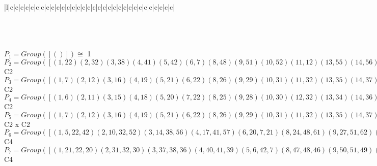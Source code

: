 \documentclass[varwidth=\maxdimen,border=10]{standalone}
\begin{document}
\begin{tabular}
\begin{array}{|l|c|c|c|c|c|c|c|c|c|c|c|c|c|c|c|c|c|c|c|c|c|c|c|c|c|c|c|c|c|c|c|c|}
\end{array}\)\\
\ \\
\ \\
$P_{1} = Group( [ () ] )\cong$ 1\ \\
$P_{2} = Group( [ ( 1,22)( 2,32)( 3,38)( 4,41)( 5,42)( 6, 7)( 8,48)( 9,51)(10,52)(11,12)(13,55)(14,56)(15,16)(17,57)(18,19)(20,21)(23,60)(24,61)(25,26)(27,62)(28,29)(30,31)(33,63)(34,35)(36,37)(39,40)(43,64)(44,45)(46,47)(49,50)(53,54)(58,59) ] )\cong$ C2\ \\
$P_{3} = Group( [ ( 1, 7)( 2,12)( 3,16)( 4,19)( 5,21)( 6,22)( 8,26)( 9,29)(10,31)(11,32)(13,35)(14,37)(15,38)(17,40)(18,41)(20,42)(23,45)(24,47)(25,48)(27,50)(28,51)(30,52)(33,54)(34,55)(36,56)(39,57)(43,59)(44,60)(46,61)(49,62)(53,63)(58,64) ] )\cong$ C2\ \\
$P_{4} = Group( [ ( 1, 6)( 2,11)( 3,15)( 4,18)( 5,20)( 7,22)( 8,25)( 9,28)(10,30)(12,32)(13,34)(14,36)(16,38)(17,39)(19,41)(21,42)(23,44)(24,46)(26,48)(27,49)(29,51)(31,52)(33,53)(35,55)(37,56)(40,57)(43,58)(45,60)(47,61)(50,62)(54,63)(59,64) ] )\cong$ C2\ \\
$P_{5} = Group( [ ( 1, 7)( 2,12)( 3,16)( 4,19)( 5,21)( 6,22)( 8,26)( 9,29)(10,31)(11,32)(13,35)(14,37)(15,38)(17,40)(18,41)(20,42)(23,45)(24,47)(25,48)(27,50)(28,51)(30,52)(33,54)(34,55)(36,56)(39,57)(43,59)(44,60)(46,61)(49,62)(53,63)(58,64), ( 1,22)( 2,32)( 3,38)( 4,41)( 5,42)( 6, 7)( 8,48)( 9,51)(10,52)(11,12)(13,55)(14,56)(15,16)(17,57)(18,19)(20,21)(23,60)(24,61)(25,26)(27,62)(28,29)(30,31)(33,63)(34,35)(36,37)(39,40)(43,64)(44,45)(46,47)(49,50)(53,54)(58,59) ] )\cong$ C2 x C2\ \\
$P_{6} = Group( [ ( 1, 5,22,42)( 2,10,32,52)( 3,14,38,56)( 4,17,41,57)( 6,20, 7,21)( 8,24,48,61)( 9,27,51,62)(11,30,12,31)(13,33,55,63)(15,36,16,37)(18,39,19,40)(23,43,60,64)(25,46,26,47)(28,49,29,50)(34,53,35,54)(44,58,45,59), ( 1,22)( 2,32)( 3,38)( 4,41)( 5,42)( 6, 7)( 8,48)( 9,51)(10,52)(11,12)(13,55)(14,56)(15,16)(17,57)(18,19)(20,21)(23,60)(24,61)(25,26)(27,62)(28,29)(30,31)(33,63)(34,35)(36,37)(39,40)(43,64)(44,45)(46,47)(49,50)(53,54)(58,59) ] )\cong$ C4\ \\
$P_{7} = Group( [ ( 1,21,22,20)( 2,31,32,30)( 3,37,38,36)( 4,40,41,39)( 5, 6,42, 7)( 8,47,48,46)( 9,50,51,49)(10,11,52,12)(13,54,55,53)(14,15,56,16)(17,18,57,19)(23,59,60,58)(24,25,61,26)(27,28,62,29)(33,34,63,35)(43,44,64,45), ( 1,22)( 2,32)( 3,38)( 4,41)( 5,42)( 6, 7)( 8,48)( 9,51)(10,52)(11,12)(13,55)(14,56)(15,16)(17,57)(18,19)(20,21)(23,60)(24,61)(25,26)(27,62)(28,29)(30,31)(33,63)(34,35)(36,37)(39,40)(43,64)(44,45)(46,47)(49,50)(53,54)(58,59) ] )\cong$ C4\ \\

\end{tabular}
\end{document}

